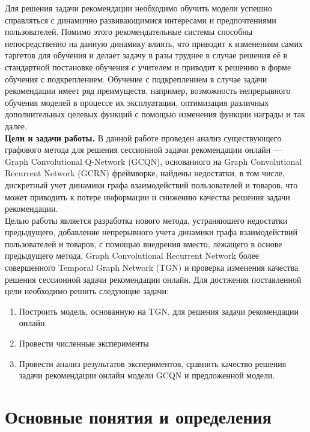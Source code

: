\documentclass[a4paper,14pt,oneside]{mipt-thesis-ms}
\begin{document}
Для решения задачи рекомендации необходимо обучить модели успешно справляться с динамично развивающимися интересами и предпочтениями пользователей. Помимо этого рекомендательные системы способны непосредственно на данную динамику влиять, что приводит к изменениям самих таргетов для обучения и делает задачу в разы труднее в случае решения её в стандартной постановке обучения с учителем и приводит к решению в форме обучения с подкреплением. Обучение с подкреплением в случае задачи рекомендации имеет ряд преимуществ, например, возможность непрерывного обучения моделей в процессе их эксплуатации, оптимизация различных дополнительных целевых функций с помощью изменения функции награды и так далее\cite{chen03}.\\

{\bf Цели и задачи работы.}
В данной работе проведен анализ существующего графового метода для решения сессионной задачи рекомендации онлайн --- Graph Convolutional Q-Network (GCQN)\cite{lei01}, основанного на Graph Convolutional Recurrent Network (GCRN)\cite{seo01} фреймворке, найдены недостатки, в том числе, дискретный учет динамики графа взаимодействий пользователей и товаров, что может приводить к потере информации и снижению качества решения задачи рекомендации.\\

Целью работы является разработка нового метода, устраняюшего недостатки предыдущего, добавление непрерывного учета динамики графа взаимодействий пользователей и товаров, с помощью внедрения вместо, лежащего в основе предыдущего метода, Graph Convolutional Recurrent Network более совершенного Temporal Graph Network (TGN)\cite{rossi01} и проверка изменения качества решения сессионной задачи рекомендации онлайн. Для достжения поставленной цели необходимо решить следующие задачи:
\begin{enumerate}
\item Построить модель, основанную на TGN, для решения задачи рекомендации онлайн.
\item Провести численные эксперименты
\item Провести анализ результатов экспериментов, сравнить качество решения задачи рекомендации онлайн модели GCQN и предложенной модели.
\end{enumerate}


\chapter{Основные понятия и определения}
\end{document}
